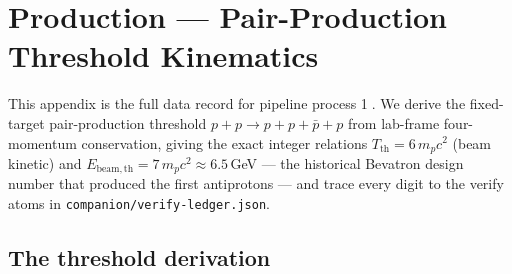 \section{Production --- Pair-Production Threshold Kinematics}
\label{app:production}

This appendix is the full data record for pipeline process
\textcircled{\scriptsize 1}. We derive the fixed-target pair-production
threshold $p+p\to p+p+\bar p+p$ from lab-frame four-momentum conservation,
giving the exact integer relations $T_{\mathrm{th}}=6\,m_pc^2$ (beam kinetic)
and $E_{\mathrm{beam,th}}=7\,m_pc^2\approx6.5$\,GeV --- the historical
Bevatron design number that produced the first antiprotons
\citep{chamberlain1955} --- and trace every digit to the verify atoms in
\texttt{companion/verify-ledger.json}.

\subsection{The threshold derivation}
\label{app:prod-deriv}

